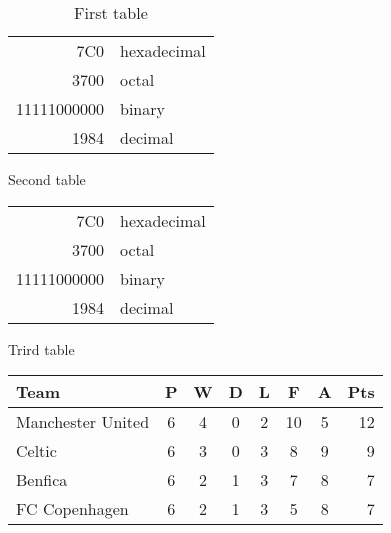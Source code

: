 \documentclass{article}
\begin{document}
\listoftables

\noindent\hrulefill\par
\noindent{}

\begin{table}
\centering
\begin{tabular}{|r|l|}
  \hline
  7C0 & hexadecimal \\
  3700 & octal \\ \cline{2-2}
  11111000000 & binary \\
  \hline \hline
  1984 & decimal \\
  \hline
\end{tabular}
\caption{First table}
\end{table}

\begin{mytable}{Second table}
\begin{tabular}{rl}
  7C0 & hexadecimal \\
  3700 & octal \\ 
  11111000000 & binary \\
  \midrule
  1984 & decimal \\
\end{tabular}
\end{mytable}

\begin{mytable}[colback=red!5]{Trird table}
\begin{tabular}{l*{6}{c}r}
Team              & P & W & D & L & F  & A & Pts \\
\midrule
Manchester United & 6 & 4 & 0 & 2 & 10 & 5 & 12  \\
Celtic            & 6 & 3 & 0 & 3 &  8 & 9 &  9  \\
Benfica           & 6 & 2 & 1 & 3 &  7 & 8 &  7  \\
FC Copenhagen     & 6 & 2 & 1 & 3 &  5 & 8 &  7  \\
\end{tabular}
\end{mytable}
\end{document}
